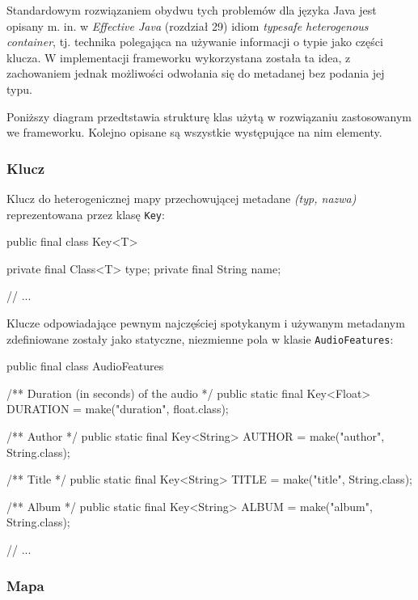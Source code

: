 Standardowym rozwiązaniem obydwu tych problemów dla języka Java jest opisany m. in. w
\textit{Effective Java} (rozdział 29) idiom \emph{typesafe heterogenous container}, tj. technika
polegająca na używanie informacji o typie jako części klucza. W implementacji frameworku
wykorzystana została ta idea, z zachowaniem jednak możliwości odwołania się do metadanej bez podania
jej typu.

Poniższy diagram przedtstawia strukturę klas użytą w rozwiązaniu zastosowanym we frameworku. Kolejno
opisane są wszystkie występujące na nim elementy.


\subsubsection{Klucz}

Klucz do heterogenicznej mapy przechowującej metadane \textit{(typ, nazwa)} reprezentowana przez
klasę \texttt{Key}:

\begin{java}
public final class Key<T> {

    private final Class<T> type;
    private final String name;

    // ...
}
\end{java}


Klucze odpowiadające pewnym najczęściej spotykanym i używanym metadanym zdefiniowane zostały jako
statyczne, niezmienne pola w klasie \texttt{AudioFeatures}:

\begin{java}
public final class AudioFeatures {

    /** Duration (in seconds) of the audio */
    public static final Key<Float> DURATION = make("duration", float.class);

    /** Author */
    public static final Key<String> AUTHOR = make("author", String.class);

    /** Title */
    public static final Key<String> TITLE = make("title", String.class);

    /** Album */
    public static final Key<String> ALBUM = make("album", String.class);

    // ...
}
\end{java}

\subsubsection{Mapa}

